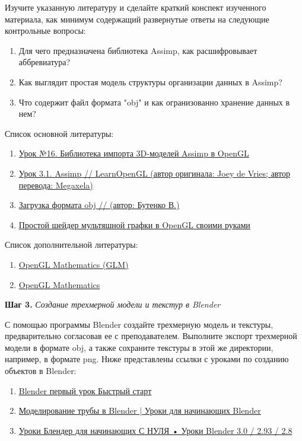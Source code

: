\documentclass[a4paper,12pt]{article}
\begin{document}
    Изучите указанную литературу и сделайте краткий конспект изученного материала, как минимум содержащий развернутые ответы на следующие контрольные вопросы:

    \begin{enumerate}
        \item 
        Для чего предназначена библиотека Assimp, как расшифровывает аббревиатура?
        \item 
        Как выглядит простая модель структуры организации данных в Assimp?
        \item 
        Что содержит файл формата "obj" и как огранизованно хранение данных в нем?
    \end{enumerate}

    Список основной литературы:
    \begin{enumerate}
        \item \href{https://ravesli.com/urok-16-biblioteka-importa-3d-modelej-assimp-v-opengl/}{Урок №16. Библиотека импорта 3D-моделей Assimp в OpenGL}
        \item \href{https://habr.com/ru/post/338436/}{Урок 3.1. Assimp // LearnOpenGL (автор оригинала: Joey de Vries; автор перевода:
        Megaxela)}
        \item \href{https://sites.google.com/site/raznyeurokipoinformatiki/home/opengl-s/zagruzka-formata-obj}{Загрузка формата obj // (автор: Бутенко В.)}
        \item \href{https://habr.com/ru/post/505726/}{Простой шейдер мультяшной графки в OpenGL своими руками}
    \end{enumerate}

    Список дополнительной литературы:
    \begin{enumerate}
        \item \href{http://www.c-jump.com/bcc/common/Talk3/Math/GLM/GLM.html#W01_0030_matrix_transformation}{OpenGL Mathematics (GLM)}
        \item \href{https://glm.g-truc.net/0.9.2/api/a00001.html}{OpenGL Mathematics}
    \end{enumerate}
    
    \textbf{Шаг 3.} \textit{Создание трехмерной модели и текстур в Blender}
    
    С помощью программы Blender создайте трехмерную модель и текстуры,
    предварительно согласовав ее с преподавателем.
    Выполните экспорт трехмерной модели в формате obj, а также сохраните текстуры в
    этой же директории, например, в формате png.
    Ниже представлены ссылки с уроками по созданию объектов в Blender:
    \begin{enumerate}
        \item \href{https://www.youtube.com/watch?v=Y0ayZ1dx78Y}{Blender первый урок Быстрый старт}
        \item \href{https://www.youtube.com/watch?v=OoCGosEVbm0}{Моделирование трубы в Blender | Уроки для начинающих Blender}
        \item \href{https://www.youtube.com/watch?v=vcRe0l-X4ko}{Уроки Блендер для начинающих С НУЛЯ • Уроки Blender 3.0 / 2.93 / 2.8}
    \end{enumerate}
    
\end{document}
